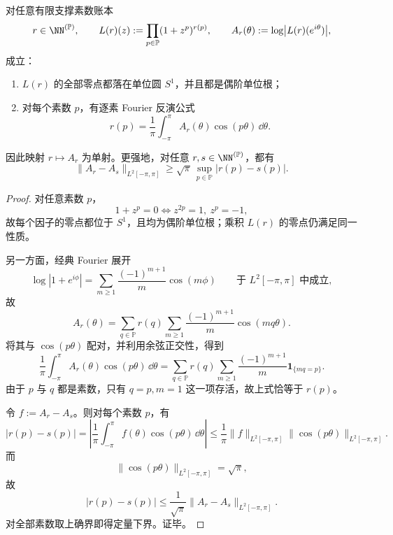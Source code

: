 \begin{theorem}[单位圆零点约束下的对数振幅全息刚性]\label{thm:conclusion-unit-circle-zero-logamplitude-holographic-rigidity}
对任意有限支撑素数账本
\[
r\in \NN^{(\mathbb P)},
\qquad
L(r)(z):=\prod_{p\in \mathbb P}(1+z^p)^{r(p)},
\qquad
A_r(\theta):=\log\bigl|L(r)(e^{i\theta})\bigr|,
\]
成立：
\begin{enumerate}
  \item \(L(r)\) 的全部零点都落在单位圆 \(S^1\)，并且都是偶阶单位根；
  \item 对每个素数 \(p\)，有逐素 Fourier 反演公式
  \[
  r(p)=\frac{1}{\pi}\int_{-\pi}^{\pi}A_r(\theta)\cos(p\theta)\,\dd\theta.
  \]
\end{enumerate}
因此映射 \(r\mapsto A_r\) 为单射。更强地，对任意 \(r,s\in \NN^{(\mathbb P)}\)，都有
\[
\|A_r-A_s\|_{L^2[-\pi,\pi]}
\ge
\sqrt{\pi}\,\sup_{p\in\mathbb P}|r(p)-s(p)|.
\]
\end{theorem}
\begin{proof}
对任意素数 \(p\)，
\[
1+z^p=0
\iff
z^{2p}=1,\ z^p=-1,
\]
故每个因子的零点都位于 \(S^1\)，且均为偶阶单位根；乘积 \(L(r)\) 的零点仍满足同一性质。

另一方面，经典 Fourier 展开
\[
\log|1+e^{i\phi}|
=
\sum_{m\ge 1}\frac{(-1)^{m+1}}{m}\cos(m\phi)
\qquad\text{于 }L^2[-\pi,\pi]\text{ 中成立},
\]
故
\[
A_r(\theta)
=
\sum_{q\in\mathbb P}r(q)\sum_{m\ge 1}\frac{(-1)^{m+1}}{m}\cos(mq\theta).
\]
将其与 \(\cos(p\theta)\) 配对，并利用余弦正交性，得到
\[
\frac{1}{\pi}\int_{-\pi}^{\pi}A_r(\theta)\cos(p\theta)\,\dd\theta
=
\sum_{q\in\mathbb P}r(q)\sum_{m\ge 1}\frac{(-1)^{m+1}}{m}\mathbf 1_{\{mq=p\}}.
\]
由于 \(p\) 与 \(q\) 都是素数，只有 \(q=p,m=1\) 这一项存活，故上式恰等于 \(r(p)\)。

令 \(f:=A_r-A_s\)。则对每个素数 \(p\)，有
\[
|r(p)-s(p)|
=
\left|
\frac{1}{\pi}\int_{-\pi}^{\pi}f(\theta)\cos(p\theta)\,\dd\theta
\right|
\le
\frac{1}{\pi}\|f\|_{L^2[-\pi,\pi]}\|\cos(p\theta)\|_{L^2[-\pi,\pi]}.
\]
而
\[
\|\cos(p\theta)\|_{L^2[-\pi,\pi]}=\sqrt{\pi},
\]
故
\[
|r(p)-s(p)|\le \frac{1}{\sqrt{\pi}}\|A_r-A_s\|_{L^2[-\pi,\pi]}.
\]
对全部素数取上确界即得定量下界。证毕。
\end{proof}

